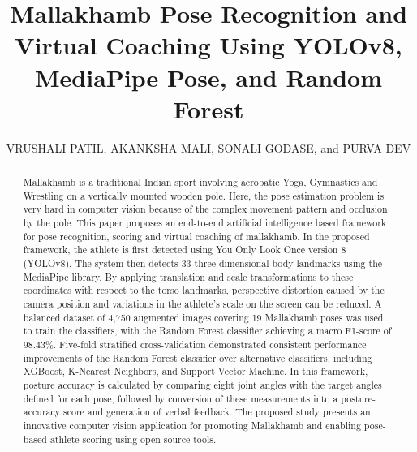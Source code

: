 \documentclass{ieeeaccess}
\begin{document}

\title{Mallakhamb Pose Recognition and Virtual Coaching Using YOLOv8, MediaPipe Pose, and Random Forest}

\author{\uppercase{Vrushali Patil},
\uppercase{Akanksha Mali},
\uppercase{Sonali Godase}, and
\uppercase{Purva Dev}}

\address[1]{Department of Computer Science and Engineering,
Rajarambapu Institute of Technology, Rajaramnagar, Maharashtra, India
(e-mail: vrushalipatil8240@gmail.com; akankshamali299@gmail.com; sonaligodase431@gmail.com; purvadev2@gmail.com)}



\begin{abstract}
Mallakhamb is a traditional Indian sport involving acrobatic Yoga, Gymnastics and Wrestling on a vertically mounted wooden pole. Here, the pose estimation problem is very hard in computer vision because of the complex movement pattern and occlusion by the pole. This paper proposes an end-to-end artificial intelligence based framework for pose recognition, scoring and virtual coaching of mallakhamb. In the proposed framework, the athlete is first detected using You Only Look Once version 8 (YOLOv8). The system then detects 33 three-dimensional body landmarks using the MediaPipe library. By applying translation and scale transformations to these coordinates with respect to the torso landmarks, perspective distortion caused by the camera position and variations in the athlete's scale on the screen can be reduced. A balanced dataset of 4,750 augmented images covering 19 Mallakhamb poses was used to train the classifiers, with the Random Forest classifier achieving a macro F1-score of 98.43\%. Five-fold stratified cross-validation demonstrated consistent performance improvements of the Random Forest classifier over alternative classifiers, including XGBoost, K-Nearest Neighbors, and Support Vector Machine. In this framework, posture accuracy is calculated by comparing eight joint angles with the target angles defined for each pose, followed by conversion of these measurements into a posture-accuracy score and generation of verbal feedback. The proposed study presents an innovative computer vision application for promoting Mallakhamb and enabling pose-based athlete scoring using open-source tools.
\end{abstract}
\end{document}
